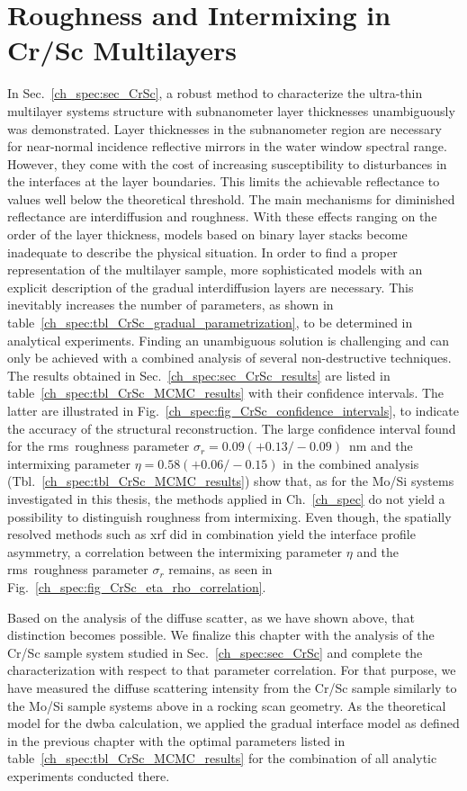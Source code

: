 \section{Roughness and Intermixing in Cr/Sc Multilayers} \label{ch_diff:sec_CrSc}
In Sec.~\ref{ch_spec:sec_CrSc}, a robust method to characterize the ultra-thin multilayer systems structure with subnanometer layer thicknesses unambiguously was demonstrated. Layer thicknesses in the subnanometer region are necessary for near-normal incidence 
reflective mirrors in the water window spectral range. However, they come with 
the cost of increasing susceptibility to disturbances in the interfaces at the 
layer boundaries. This limits the achievable reflectance to values well below 
the theoretical threshold. The main mechanisms for diminished reflectance are 
interdiffusion and roughness. With these effects ranging on the order of the 
layer thickness, models based on binary layer stacks become inadequate to 
describe the physical situation. In order to find a proper representation of 
the multilayer sample, more sophisticated models with an explicit description 
of the gradual interdiffusion layers are necessary. This inevitably 
increases the number of parameters, as shown in table~\ref{ch_spec:tbl_CrSc_gradual_parametrization}, to be determined in analytical experiments. 
Finding an unambiguous solution is challenging and can only be achieved with a 
combined analysis of several non-destructive techniques. The results obtained in Sec.~\ref{ch_spec:sec_CrSc_results} are listed in table~\ref{ch_spec:tbl_CrSc_MCMC_results} with their confidence intervals. The latter are illustrated in Fig.~\ref{ch_spec:fig_CrSc_confidence_intervals}, to indicate the accuracy of the structural reconstruction. The large confidence interval found for the \gls{rms}~roughness parameter $\sigma_r = 0.09(+0.13/-0.09)$~nm and the intermixing parameter $\eta = 0.58(+0.06/-0.15)$ in the combined analysis (Tbl.~\ref{ch_spec:tbl_CrSc_MCMC_results}) show that, as for the Mo/Si systems investigated in this thesis, the methods applied in Ch.~\ref{ch_spec} do not yield a possibility to distinguish roughness from intermixing. Even though, the spatially resolved methods such as \gls{xrf} did in combination yield the interface profile asymmetry, a correlation between the intermixing parameter $\eta$ and the \gls{rms}~roughness parameter $\sigma_r$ remains, as seen in Fig.~\ref{ch_spec:fig_CrSc_eta_rho_correlation}.

Based on the analysis of the diffuse scatter, as we have shown above, that distinction becomes possible. We finalize this chapter with the analysis of the Cr/Sc sample system studied in Sec.~\ref{ch_spec:sec_CrSc} and complete the characterization with respect to that parameter correlation. For that purpose, we have measured the diffuse scattering intensity from the Cr/Sc sample similarly to the Mo/Si sample systems above in a rocking scan geometry. As the theoretical model for the \gls{dwba} calculation, we applied the gradual interface model as defined in the previous chapter with the optimal parameters listed in table~\ref{ch_spec:tbl_CrSc_MCMC_results} for the combination of all analytic experiments conducted there.

